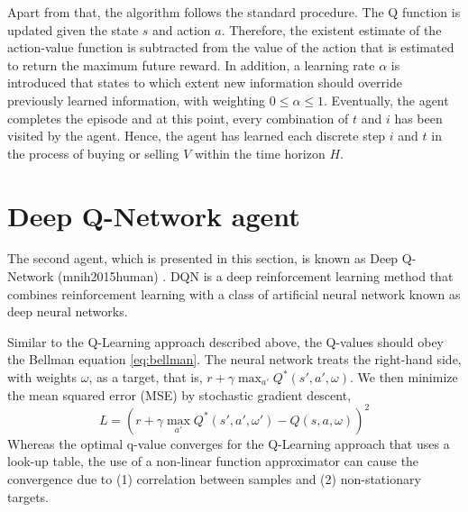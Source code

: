 Apart from that, the algorithm follows the standard procedure.
The Q function is updated given the state $s$ and action $a$.
Therefore, the existent estimate of the action-value function is subtracted from the value of the action that is estimated to return the maximum future reward.
In addition, a learning rate $\alpha$ is introduced that states to which extent new information should override previously learned information, with weighting $0 \le \alpha \le 1$.
Eventually, the agent completes the episode and at this point, every combination of $t$ and $i$ has been visited by the agent.
Hence, the agent has learned each discrete step $i$ and $t$ in the process of buying or selling $V$ within the time horizon $H$.

\section{Deep Q-Network agent}
\label{setup:dqn}
The second agent, which is presented in this section, is known as Deep Q-Network (mnih2015human) \cite{mnih2015human}.
DQN is a deep reinforcement learning method that combines reinforcement learning with a class
of artificial neural network known as deep neural networks.


Similar to the Q-Learning approach described above, the Q-values should obey the Bellman equation \ref{eq:bellman}.
The neural network treats the right-hand side, with weights $\omega$, as a target, that is, $r+\gamma \max_{a'} Q^*(s',a', \omega)$.
We then minimize the mean squared error (MSE) by stochastic gradient descent,
\begin{equation}
    L=(r+\gamma \max_{a'} Q^*(s',a', \omega') - Q(s,a,\omega))^2
\end{equation}
Whereas the optimal q-value converges for the Q-Learning approach that uses a look-up table, the use of a non-linear function approximator can cause the convergence due to (1) correlation between samples and (2) non-stationary targets.


